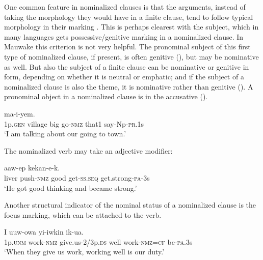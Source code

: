 One common feature in nominalized clauses is that the arguments, instead of taking the morphology they would have in a finite clause, tend to follow typical  morphology in their marking \citep[738]{HopperEtAl1984}%
. This is perhaps clearest with the subject, which in many languages gets possessive/genitive marking in a nominalized clause. In Mauwake this criterion is not very helpful. The pronominal subject of this first type of nominalized clause, if present, is often genitive (), but may be nominative as well. But also the subject of a finite clause can be nominative or genitive in form, depending on whether it is neutral or emphatic; and if the subject of a nominalized clause is also the theme, it is nominative rather than genitive (). A pronominal object in a nominalized clause is in the accusative (). 

\ea%
\label{ex:x1228}
\gll {}      ma-i-yem. \\
     1p.\textsc{gen}  village  big  go-\textsc{nmz}  that1  say-Np-\textsc{pr}.1s \\
\glt `I am talking about our going to town.'
\z

The nominalized verb may take an adjective modifier:

\ea%
\label{ex:x1240}
\gll {}    aaw-ep  kekan-e-k. \\
     liver  push-\textsc{nmz}  good  get-\textsc{ss}.\textsc{seq}  get.strong-\textsc{pa}-3s \\
\glt `He got good thinking and became strong.'
\z

Another structural indicator of the nominal status of a nominalized clause is the focus marking, which can be attached to the verb. 

\ea%
\label{ex:x1238}
\gll I  uuw-owa  yi-iwkin    ik-ua. \\
     1p.\textsc{unm}  work-\textsc{nmz}  give.us-2/3p.\textsc{ds}  well  work-\textsc{nmz}=\textsc{cf} be-\textsc{pa}.3s \\
\glt `When they give us work, working well is our duty.'
\z

